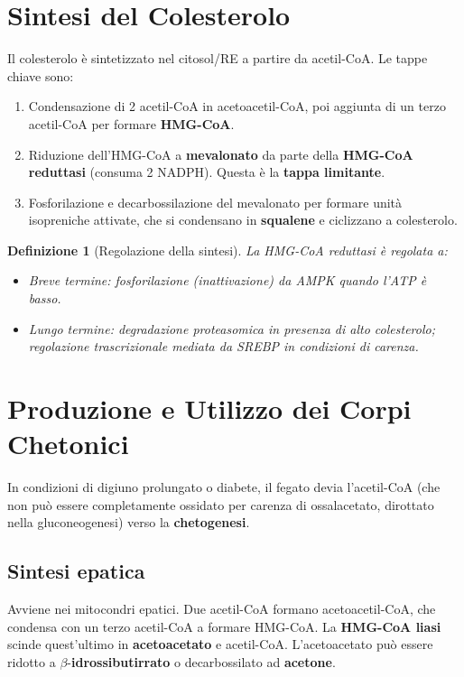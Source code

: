 \documentclass[12pt,a4paper]{report}
\newtheorem{definizione}{Definizione}[section]
\begin{document}
\section{Sintesi del Colesterolo}
Il colesterolo è sintetizzato nel citosol/RE a partire da acetil-CoA. Le tappe chiave sono:
\begin{enumerate}
\item Condensazione di 2 acetil-CoA in acetoacetil-CoA, poi aggiunta di un terzo acetil-CoA per formare \textbf{HMG-CoA}.
\item Riduzione dell'HMG-CoA a \textbf{mevalonato} da parte della \textbf{HMG-CoA reduttasi} (consuma 2 NADPH). Questa è la \textbf{tappa limitante}.
\item Fosforilazione e decarbossilazione del mevalonato per formare unità isopreniche attivate, che si condensano in \textbf{squalene} e ciclizzano a colesterolo.
\end{enumerate}
\begin{definizione}[Regolazione della sintesi]
La HMG-CoA reduttasi è regolata a:
\begin{itemize}
\item \textit{Breve termine}: fosforilazione (inattivazione) da AMPK quando l'ATP è basso.
\item \textit{Lungo termine}: degradazione proteasomica in presenza di alto colesterolo; regolazione trascrizionale mediata da SREBP in condizioni di carenza.
\end{itemize}
\end{definizione}

\section{Produzione e Utilizzo dei Corpi Chetonici}
In condizioni di digiuno prolungato o diabete, il fegato devia l'acetil-CoA (che non può essere completamente ossidato per carenza di ossalacetato, dirottato nella gluconeogenesi) verso la \textbf{chetogenesi}.
\subsection{Sintesi epatica}
Avviene nei mitocondri epatici. Due acetil-CoA formano acetoacetil-CoA, che condensa con un terzo acetil-CoA a formare HMG-CoA. La \textbf{HMG-CoA liasi} scinde quest'ultimo in \textbf{acetoacetato} e acetil-CoA. L'acetoacetato può essere ridotto a \(\beta\)-\textbf{idrossibutirrato} o decarbossilato ad \textbf{acetone}.
\end{document}

